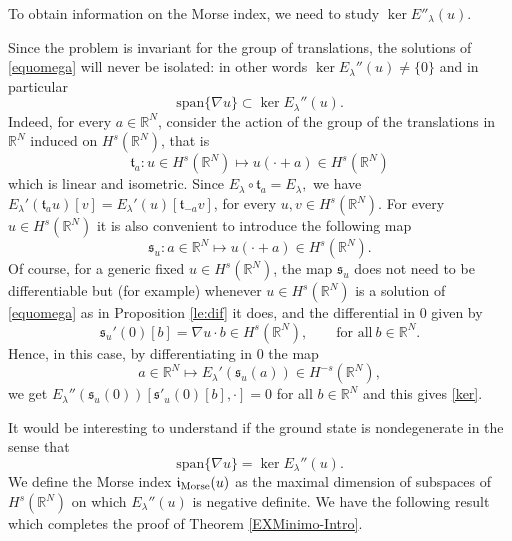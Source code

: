 \documentclass[10pt]{amsart}
\numberwithin{equation}{section}
\begin{document}
\noindent
To obtain information on the Morse index, we need to study $\ker E''_{\lambda}(u).$

\noindent
Since the problem is invariant for the  group of translations,
the  solutions of \eqref{equomega} will never be isolated:
in other words $\ker E_{\lambda}''(u)\neq \{0\}$ and in particular
\begin{equation}\label{ker}
\textrm{span} \{ \nabla u \} \subset \ker E_{\lambda}''(u).
\end{equation}
Indeed, for every $a\in \mathbb R^{N}$, consider the action of the group of the translations in $\mathbb R^{N}$   induced on $H^{s}(\mathbb R^{N})$, that is
\begin{equation*}
\mathfrak t_{a}: u\in H^{s}(\mathbb R^{N})\longmapsto u(\cdot+a)\in H^{s}(\mathbb R^{N})
\end{equation*}
which is linear and isometric. Since $E_{\lambda}\circ \mathfrak t_{a}= E_{\lambda},$
we have $E_{\lambda}'(\mathfrak t_{a}u)[v]=E_{\lambda}'(u)[\mathfrak t_{-a}v]$, for every $u,v\in H^{s}(\mathbb R^{N}).$
For every $u\in H^{s}(\mathbb R^{N})$ it is also convenient to introduce
the following map
\begin{equation*}
\mathfrak s_{u}: a\in \mathbb R^{N}\longmapsto u(\cdot+a)\in H^{s}(\mathbb R^{N}).
\end{equation*}
Of course, for a generic fixed $u\in H^{s}(\mathbb R^{N})$, the map $\mathfrak s_{u}$  does not need to be differentiable but
(for example) whenever $u\in H^{s}(\mathbb R^{N})$
is a solution   of \eqref{equomega}  as in Proposition \ref{le:dif} it does,  and the differential in $0$ given by
 $$\mathfrak s_{u}'(0)[b]= \nabla u \cdot b\in H^{s}(\mathbb R^{N}),\qquad \text{for all} \  b\in \mathbb R^{N}.$$
 Hence, in this case, 
 by differentiating in $0$ the map
 $$a\in \mathbb R^{N}\longmapsto E_{\lambda}'(\mathfrak s_{u}(a))\in H^{-s}(\mathbb R^{N}),$$
 we get $E_{\lambda}''(\mathfrak s_{u}(0))[\mathfrak s'_{u}(0)[b], \cdot ]=0$ for all $b\in \mathbb R^{N}$
and this gives \eqref{ker}.

\medskip

\noindent
It would be interesting to understand if the ground state is nondegenerate in the sense that
\begin{equation*}
\textrm{span} \{ \nabla u \} = \ker E_{\lambda}''(u).
\end{equation*}
We define the Morse index  $\mathfrak i_{\rm Morse}(u)$
as the maximal dimension of subspaces of $H^{s}(\mathbb R^{N})$
on which $E_{\lambda}''(u)$ is negative definite. We have the following result
which completes the proof of Theorem \ref{EXMinimo-Intro}.
\end{document}
